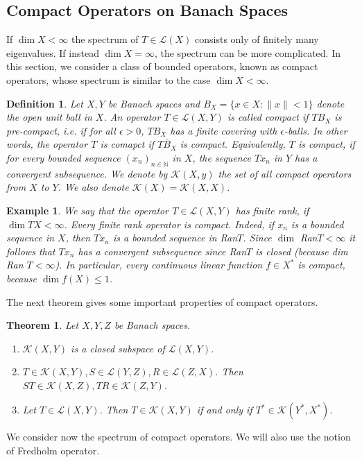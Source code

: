 \documentclass[11pt,a4paper]{article}
\newtheorem{thm}{Theorem}[section]
\newtheorem{defn}{Definition}[section]
\newtheorem{exmp}{Example}[section]
\theoremstyle{definition}
\begin{document}
\subsection{Compact Operators on Banach Spaces}
If $\dim X < \infty$ the spectrum of $T \in \mathcal{L}(X)$ consists only of finitely many eigenvalues. If instead $\dim X= \infty$, the spectrum can be more complicated. In this section, we consider a class of bounded operators, known as compact operators, whose spectrum is similar to the case $\dim X < \infty$. 
\begin{defn} Let $X,Y$ be Banach spaces and $B_X= \lbrace x \in X : \|x \| < 1 \rbrace$ denote the open unit ball in $X$. An operator $T \in \mathcal{L}(X,Y)$ is called compact if $TB_X$ is pre-compact, i.e. if for all $\epsilon >0$, $TB_X$ has a finite covering with $\epsilon$-balls. In other words, the operator $T$ is comapct if $\overline{TB_X}$ is compact. Equivalently, $T$ is compact, if  for every bounded sequence $(x_n)_{n \in \mathbb{N}}$ in $X$, the sequence $Tx_n$ in $Y$ has a convergent subsequence. We denote by $\mathcal{K}(X,y)$ the set of all compact operators from $X$ to $Y$. We also denote $\mathcal{K}(X)= \mathcal{K}(X,X)$. 
\end{defn}
\begin{exmp} We say that the operator $T \in \mathcal{L}(X,Y)$ has finite rank, if $\dim TX < \infty$. Every finite rank operator is compact. Indeed, if $x_n$ is a bounded sequence in $X$, then $Tx_n$ is a bounded sequence in Ran$T$. Since $\dim$ Ran$T< \infty$ it follows that $Tx_n$ has a convergent subsequence since Ran$T$ is closed (because dim Ran $T< \infty$). In particular, every continuous linear function $f \in X^*$ is compact, because $\dim f(X) \leq 1$. 
\end{exmp}
\noindent The next theorem gives some important properties of compact operators. 
\begin{thm} Let $X,Y,Z$ be Banach spaces.
\begin{enumerate}
\item $\mathcal{K}(X,Y)$ is a closed subspace of $\mathcal{L}(X,Y)$.
\item $T \in \mathcal{K}(X,Y), S \in \mathcal{L}(Y,Z), R \in \mathcal{L}(Z,X)$. Then $ST \in \mathcal{K}(X,Z), TR \in \mathcal{K}(Z,Y)$. 
\item Let $T \in \mathcal{L}(X,Y)$. Then $T \in \mathcal{K}(X,Y)$ if and only if $T^* \in \mathcal{K}(Y^*, X^*)$. 
\end{enumerate}
\end{thm}
We consider now the spectrum of compact operators. We will also use the notion of Fredholm operator. 
\end{document}
